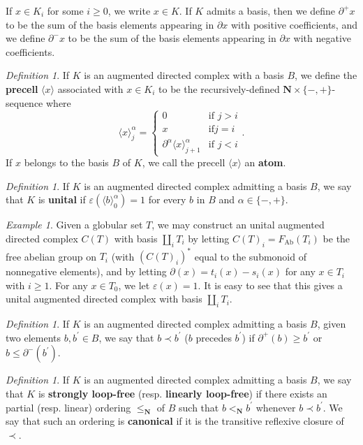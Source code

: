 \documentclass[10pt]{amsart}
\numberwithin{equation}{section}
\theoremstyle{plain}   %
\theoremstyle{remark}
\newtheorem{example}[subsection]{Example}
\newtheorem{defn}[subsection]{Definition}
\theoremstyle{plain}
\newcommand{\dfn}{\textbf}
\begin{document}
If \(x\in K_i\) for some \(i\geq 0\), we write \(x\in K\).  If \(K\) admits a basis, then we define \(\partial^+ x\) to be the sum of the basis elements appearing in \(\partial x\) with positive coefficients, and we define \(\partial^- x\) to be the sum of the basis elements appearing in \(\partial x\) with negative coefficients.
\begin{defn}If \(K\) is an augmented directed complex with a basis \(B\), we define the \dfn{precell} \(\langle x\rangle\) associated with \(x\in K_i\) to be the recursively-defined \(\mathbf{N}\times \{-,+\}\)-sequence where 
\[
\langle x \rangle^\alpha_j=
\begin{cases}0& \text{if \(j>i\)}\\
x&\text{if\(j=i\)}\\
\partial^\alpha \langle x \rangle^\alpha_{j+1} & \text{if \(j<i\)}\end{cases}.\]
If \(x\) belongs to the basis \(B\) of \(K\), we call the precell \(\langle x \rangle\) an \dfn{atom}.
\end{defn}
\begin{defn} If \(K\) is an augmented directed complex admitting a basis \(B\), we say that \(K\) is \dfn{unital} if \(\varepsilon (\langle b \rangle^\alpha_0)=1\) for every \(b\) in \(B\) and \(\alpha \in \{-,+\}\).  
\end{defn}
\begin{example} Given a globular set \(T\), we may construct an unital augmented directed complex \(C(T)\) with basis \(\coprod_{i} T_i\) by letting \(C(T)_i=F_{\operatorname{Ab}}(T_i)\) be the free abelian group on \(T_i\) (with \((C(T)_i)^\ast\) equal to the submonoid of nonnegative elements), and by letting \(\partial(x)=t_i(x)-s_i(x)\) for any \(x \in T_i\) with \(i\geq 1\).  For any \(x\in T_0\), we let \(\varepsilon(x)=1\).  It is easy to see that this gives a unital augmented directed complex with basis \(\coprod_{i} T_i\).
\end{example}
\begin{defn} If \(K\) is an augmented directed complex admitting a basis \(B\), given two elements \(b,b^\prime \in B\), we say that \(b \prec b^\prime\) (\(b\) precedes \(b^\prime\)) if \(\partial^+(b) \geq b^\prime\) or \(b\leq \partial^-(b^\prime)\).    
\end{defn}
\begin{defn} If \(K\) is an augmented directed complex admitting a basis \(B\), we say that \(K\) is \dfn{strongly loop-free} (resp. \dfn{linearly loop-free}) if there exists an partial (resp. linear) ordering \(\leq_{\mathbf{N}}\) of \(B\) such that \(b <_{\mathbf{N}} b^\prime\) whenever \(b\prec b^\prime\).  We say that such an ordering is \dfn{canonical} if it is the transitive reflexive closure of \(\prec\).  
\end{defn}
\end{document}
